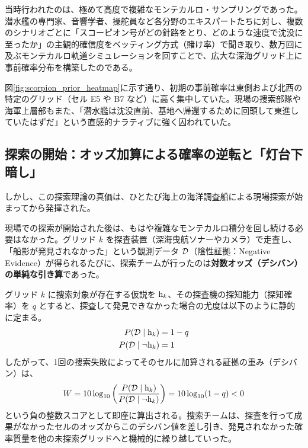     当時行われたのは、極めて高度で複雑なモンテカルロ・サンプリングであった。潜水艦の専門家、音響学者、操舵員など各分野のエキスパートたちに対し、複数のシナリオごとに「スコーピオン号がどの針路をとり、どのような速度で沈没に至ったか」の主観的確信度をベッティング方式（賭け率）で聞き取り、数万回に及ぶモンテカルロ軌道シミュレーションを回すことで、広大な深海グリッド上に事前確率分布を構築したのである。

    

    図\ref{fig:scorpion_prior_heatmap}に示す通り、初期の事前確率は東側および北西の特定のグリッド（セル E5 や B7 など）に高く集中していた。現場の捜索部隊や海軍上層部もまた、「潜水艦は沈没直前、基地へ帰還するために回頭して東進していたはずだ」という直感的ナラティブに強く囚われていた。

    \subsection{探索の開始：オッズ加算による確率の逆転と「灯台下暗し」}

    しかし、この探索理論の真価は、ひとたび海上の海洋調査船による現場探索が始まってから発揮された。

    現場での探索が開始された後は、もはや複雑なモンテカルロ積分を回し続ける必要はなかった。グリッド $k$ を探査装置（深海曳航ソナーやカメラ）で走査し、「船影が発見されなかった」という観測データ $\mathcal{D}$（陰性証拠：Negative Evidence）が得られるたびに、探索チームが行ったのは\textbf{対数オッズ（デシバン）の単純な引き算}であった。

    グリッド $k$ に捜索対象が存在する仮説を $\mathrm{h}_k$、その探査機の探知能力（探知確率）を $q$ とすると、探査して発見できなかった場合の尤度は以下のように静的に定まる。
    \begin{align}
        P(\mathcal{D} \mid \mathrm{h}_k) &= 1 - q \\
        P(\mathcal{D} \mid \neg \mathrm{h}_k) &= 1
    \end{align}
    したがって、1回の捜索失敗によってそのセルに加算される証拠の重み（デシバン）は、
    \begin{equation}
        W = 10 \log_{10}\left( \frac{P(\mathcal{D} \mid \mathrm{h}_k)}{P(\mathcal{D} \mid \neg \mathrm{h}_k)} \right) = 10 \log_{10}(1 - q) < 0
    \end{equation}
    という負の整数スコアとして即座に算出される。捜索チームは、探査を行って成果がなかったセルのオッズからこのデシバン値を差し引き、発見されなかった確率質量を他の未探索グリッドへと機械的に繰り越していった。


